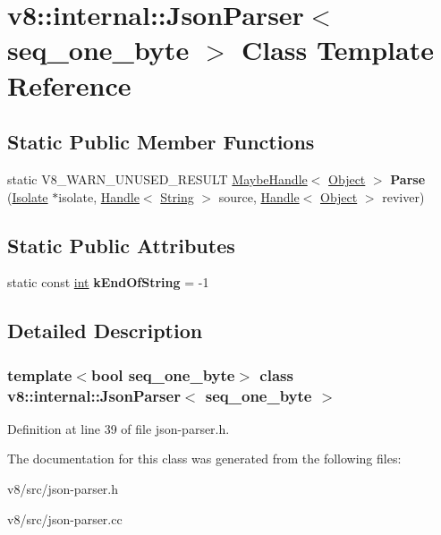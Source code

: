\hypertarget{classv8_1_1internal_1_1JsonParser}{}\section{v8\+:\+:internal\+:\+:Json\+Parser$<$ seq\+\_\+one\+\_\+byte $>$ Class Template Reference}
\label{classv8_1_1internal_1_1JsonParser}
\subsection*{Static Public Member Functions}
\begin{DoxyCompactItemize}
\item 
\mbox{\label{classv8_1_1internal_1_1JsonParser_af2fc89f3975c87945c13f2b43d840a16}} 
static V8\+\_\+\+W\+A\+R\+N\+\_\+\+U\+N\+U\+S\+E\+D\+\_\+\+R\+E\+S\+U\+LT \mbox{\hyperlink{classv8_1_1internal_1_1MaybeHandle}{Maybe\+Handle}}$<$ \mbox{\hyperlink{classv8_1_1internal_1_1Object}{Object}} $>$ {\bfseries Parse} (\mbox{\hyperlink{classv8_1_1internal_1_1Isolate}{Isolate}} $\ast$isolate, \mbox{\hyperlink{classv8_1_1internal_1_1Handle}{Handle}}$<$ \mbox{\hyperlink{classv8_1_1internal_1_1String}{String}} $>$ source, \mbox{\hyperlink{classv8_1_1internal_1_1Handle}{Handle}}$<$ \mbox{\hyperlink{classv8_1_1internal_1_1Object}{Object}} $>$ reviver)
\end{DoxyCompactItemize}
\subsection*{Static Public Attributes}
\begin{DoxyCompactItemize}
\item 
\mbox{\label{classv8_1_1internal_1_1JsonParser_a9de7ec5380eeb91286bd7a02360bf5a7}} 
static const \mbox{\hyperlink{classint}{int}} {\bfseries k\+End\+Of\+String} = -\/1
\end{DoxyCompactItemize}


\subsection{Detailed Description}
\subsubsection*{template$<$bool seq\+\_\+one\+\_\+byte$>$\newline
class v8\+::internal\+::\+Json\+Parser$<$ seq\+\_\+one\+\_\+byte $>$}



Definition at line 39 of file json-\/parser.\+h.



The documentation for this class was generated from the following files\+:\begin{DoxyCompactItemize}
\item 
v8/src/json-\/parser.\+h\item 
v8/src/json-\/parser.\+cc\end{DoxyCompactItemize}
